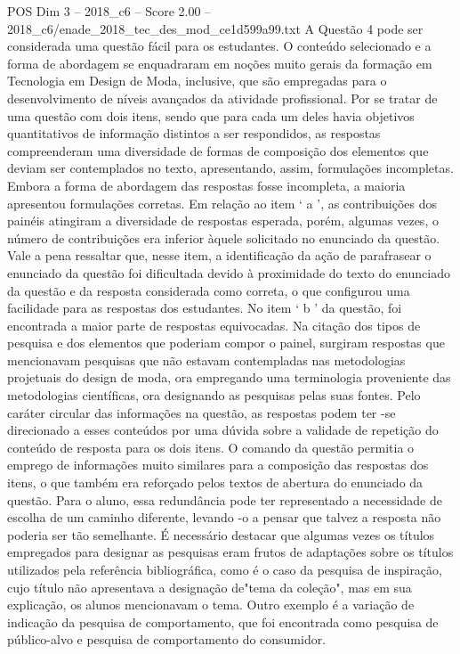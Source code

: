 \begin{textsample}{POS Dim 3 – 2018\_c6 – Score 2.00 – 2018\_c6/enade\_2018\_tec\_des\_mod\_ce1d599a99.txt}
A Questão 4 pode ser considerada uma questão fácil para os estudantes.
O conteúdo selecionado e a forma de abordagem se enquadraram em noções muito gerais da formação em Tecnologia em Design de Moda, inclusive, que são empregadas para o desenvolvimento de níveis avançados da atividade profissional.
Por se tratar de uma questão com dois itens, sendo que para cada um deles havia objetivos quantitativos de informação distintos a ser respondidos, as respostas compreenderam uma diversidade de formas de composição dos elementos que deviam ser contemplados no texto, apresentando, assim, formulações incompletas.
Embora a forma de abordagem das respostas fosse incompleta, a maioria apresentou formulações corretas.
Em relação ao item ‘ a ’, as contribuições dos painéis atingiram a diversidade de respostas esperada, porém, algumas vezes, o número de contribuições era inferior àquele solicitado no enunciado da questão.
Vale a pena ressaltar que, nesse item, a identificação da ação de parafrasear o enunciado da questão foi dificultada devido à proximidade do texto do enunciado da questão e da resposta considerada como correta, o que configurou uma facilidade para as respostas dos estudantes.
No item ‘ b ’ da questão, foi encontrada a maior parte de respostas equivocadas.
Na citação dos tipos de pesquisa e dos elementos que poderiam compor o painel, surgiram respostas que mencionavam pesquisas que não estavam contempladas nas metodologias projetuais do design de moda, ora empregando uma terminologia proveniente das metodologias científicas, ora designando as pesquisas pelas suas fontes.
Pelo caráter circular das informações na questão, as respostas podem ter -se direcionado a esses conteúdos por uma dúvida sobre a validade de repetição do conteúdo de resposta para os dois itens.
O comando da questão permitia o emprego de informações muito similares para a composição das respostas dos itens, o que também era reforçado pelos textos de abertura do enunciado da questão.
Para o aluno, essa redundância pode ter representado a necessidade de escolha de um caminho diferente, levando -o a pensar que talvez a resposta não poderia ser tão semelhante.
É necessário destacar que algumas vezes os títulos empregados para designar as pesquisas eram frutos de adaptações sobre os títulos utilizados pela referência bibliográfica, como é o caso da pesquisa de inspiração, cujo título não apresentava a designação de"tema da coleção", mas em sua explicação, os alunos mencionavam o tema.
Outro exemplo é a variação de indicação da pesquisa de comportamento, que foi encontrada como pesquisa de público-alvo e pesquisa de comportamento do consumidor.

\end{textsample}
